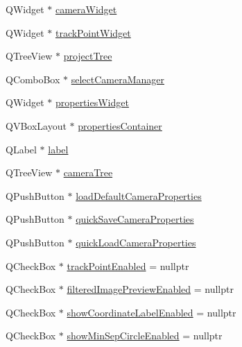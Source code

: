 \begin{DoxyCompactItemize}
\item 
Q\+Widget $\ast$ \mbox{\hyperlink{class_ui___main_window_a677091816d535f2dd2532325ac166a5b}{camera\+Widget}}
\item 
Q\+Widget $\ast$ \mbox{\hyperlink{class_ui___main_window_a20589136192063f4da16d6bf98dec50c}{track\+Point\+Widget}}
\item 
Q\+Tree\+View $\ast$ \mbox{\hyperlink{class_ui___main_window_a2b13bf8bfcef21d096a8ca77d0b0f96b}{project\+Tree}}
\item 
Q\+Combo\+Box $\ast$ \mbox{\hyperlink{class_ui___main_window_aef0eeab19f2137affd96e9072b5946f1}{select\+Camera\+Manager}}
\item 
Q\+Widget $\ast$ \mbox{\hyperlink{class_ui___main_window_abff40f308a27a90d7b900451cb738e5d}{properties\+Widget}}
\item 
Q\+V\+Box\+Layout $\ast$ \mbox{\hyperlink{class_ui___main_window_ad05ae2f87292c80739fb6225d6ee8b9b}{properties\+Container}}
\item 
Q\+Label $\ast$ \mbox{\hyperlink{class_ui___main_window_ad9c89133780f28e6efa2ec17ceb9cff5}{label}}
\item 
Q\+Tree\+View $\ast$ \mbox{\hyperlink{class_ui___main_window_aace455e8b0095e701e4e1d5b3467f850}{camera\+Tree}}
\item 
Q\+Push\+Button $\ast$ \mbox{\hyperlink{class_ui___main_window_a0c1751aaf8076bf6806bf26d08e52c5e}{load\+Default\+Camera\+Properties}}
\item 
Q\+Push\+Button $\ast$ \mbox{\hyperlink{class_ui___main_window_aeb6e0f7819d4ab45e09c419dc26ebcc8}{quick\+Save\+Camera\+Properties}}
\item 
Q\+Push\+Button $\ast$ \mbox{\hyperlink{class_ui___main_window_a515051950e6949599e5f4ca5b6726c9d}{quick\+Load\+Camera\+Properties}}
\item 
Q\+Check\+Box $\ast$ \mbox{\hyperlink{class_ui___main_window_a5a3c0653d6a320ec1274228214d44a06}{track\+Point\+Enabled}} = nullptr
\item 
Q\+Check\+Box $\ast$ \mbox{\hyperlink{class_ui___main_window_aaeb9a0aeaf3dbd0c56283fa64b46a8ae}{filtered\+Image\+Preview\+Enabled}} = nullptr
\item 
Q\+Check\+Box $\ast$ \mbox{\hyperlink{class_ui___main_window_ae3adfcd6418482ab1b1a3174ef57eabf}{show\+Coordinate\+Label\+Enabled}} = nullptr
\item 
Q\+Check\+Box $\ast$ \mbox{\hyperlink{class_ui___main_window_a43638134544549986252295422f16cc0}{show\+Min\+Sep\+Circle\+Enabled}} = nullptr
\item 

\end{DoxyCompactItemize}

